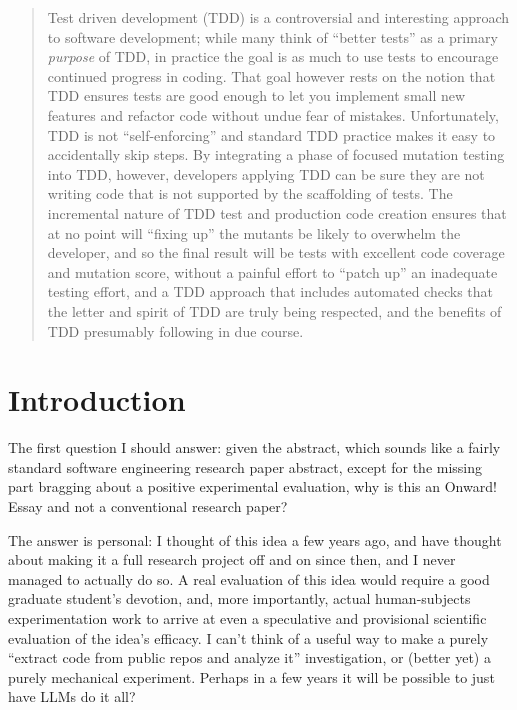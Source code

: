 \documentclass[sigplan,screen]{acmart}
\begin{document}
\begin{abstract}
Test driven development (TDD) is a controversial and interesting approach to
software development; while many think of ``better tests'' as a
primary \emph{purpose} of TDD, in practice the goal is as much to use
tests to encourage continued progress in coding.   That goal however
rests on the notion that TDD ensures tests are good enough to let you
implement small new features and refactor code without undue fear of
mistakes.  Unfortunately, TDD is not ``self-enforcing'' and standard
TDD practice makes it easy to accidentally skip steps.  By integrating
a phase of focused mutation testing into TDD, however, developers
applying TDD can be sure they are not writing code that is not
supported by the scaffolding of tests.  The incremental nature of TDD
test and production code creation ensures that at no point will
``fixing up'' the mutants be likely to overwhelm the developer, and so
the final result will be tests with excellent code coverage and
mutation score, without a painful effort to ``patch up'' an inadequate
testing effort, and a TDD approach that includes automated checks that
the letter and spirit of TDD are truly being respected, and the
benefits of TDD presumably following in due course.
  \end{abstract}



\maketitle


\section{Introduction}

The first question I should answer: given the abstract, which sounds
like a fairly standard software engineering research paper abstract,
except for the missing part bragging
about a positive experimental evaluation, why is this an Onward! Essay
and not a conventional research paper?

The answer is personal:  I thought of this idea a few years ago, and
have thought about making it a full research project off and on since
then, and I
never managed to actually do so.  A real evaluation of this idea would
require a good graduate student's devotion, and, more importantly,
actual human-subjects experimentation work to arrive at even a
speculative and provisional scientific evaluation of the idea's
efficacy.  I can't think of a useful way to make a purely ``extract
code from public repos and analyze it'' investigation, or (better yet)
a purely mechanical experiment.  Perhaps in a few years it will be
possible to just have LLMs do it all?
\end{document}
